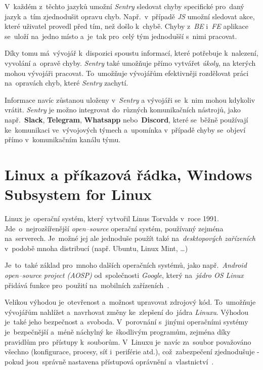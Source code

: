 \documentclass[11pt,a4paper]{report}
\let\oldacrshort\acrshort
\renewcommand{\acrshort}[1]{\emph{\normalsize\color[rgb]{0,0,0}\noindent\oldacrshort{#1}}}
\begin{document}
                V~každém z~těchto jazyků umožní \emph{Sentry} sledovat chyby specifické pro~daný jazyk a~tím zjednodušit opravu chyb. Např.~v~případě \acrshort{JS} umožní sledovat akce, které uživatel provedl před tím, než došlo k~chybě. Chyby z~\acrshort{BE} i~\acrshort{FE} aplikace se~uloží na~jedno místo a~je~tak pro~celý tým jednodušší s~nimi pracovat.

                Díky tomu má~vývojář k~dispozici spoustu informací, které potřebuje k~nalezení, vyvolání a~opravě chyby. \emph{Sentry} také umožňuje přímo vytvářet \emph{úkoly}, na kterých mohou vývojáři pracovat. To~umožňuje vývojářům efektivněji rozdělovat práci na~opravách chyb, které \emph{Sentry} zachytí.

                Informace navíc zůstanou uloženy v~\emph{Sentry} a vývojáři se~k~nim mohou kdykoliv vrátit. \emph{Sentry} je možno integrovat do~různých komunikačních nástrojů, jako např.~\textbf{Slack}, \textbf{Telegram}, \textbf{Whatsapp} nebo~\textbf{Discord}, které se~běžně používají ke~komunikaci ve~vývojových týmech a~upomínka v~případě chyby se~objeví přímo v~komunikačním kanálu týmu.

        \section{Linux a příkazová řádka, Windows Subsystem for Linux}
            Linux je~operační systém, který vytvořil Linus Torvalds v~roce 1991. Jde~o~nejrozšířenější \emph{open--source} operační systém, používaný zejména na~serverech. Je~možné jej ale jednoduše použít také na~\emph{desktopových zařízeních} v~podobě mnoha distribucí (např. Ubuntu, Linux Mint, \dots)
            
            Je~to~také základ pro~mnoho dalších operačních systémů, jako např.~\emph{Android open--source project (\emph{AOSP})} od~společnosti \emph{Google}, který na~\emph{jádro OS Linux} přidává funkce pro~použití na~mobilních zařízeních~\cite{AOSP:linux}.
            
            Velikou výhodou je~otevřenost a~možnost upravovat zdrojový kód. To~umožňuje vývojářům nahlížet a~navrhovat změny ke~zlepšení do~jádra \emph{Linuxu}. Výhodou je~také jeho bezpečnost a~svoboda. V~porovnání s~jinými operačními systémy je~bezpečnější a~méně náchylný ke~škodlivým programům, zejména díky pravidlům pro~přístupy k~souborům. V~Linuxu je~navíc za~soubor považováno všechno (konfigurace, procesy, síť i~periférie atd.), což~zabezpečení zjednodušuje - pokud jsou~správně nastavena přístupová oprávnění a~vlastnictví~\cite{medium:LinuxSecure}.
\end{document}

